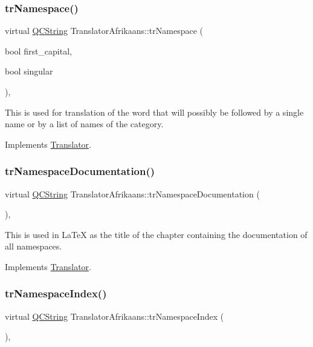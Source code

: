\subsubsection{\texorpdfstring{trNamespace()}{trNamespace()}}
{\footnotesize\ttfamily virtual \mbox{\hyperlink{class_q_c_string}{Q\+C\+String}} Translator\+Afrikaans\+::tr\+Namespace (\begin{DoxyParamCaption}\item[{bool}]{first\+\_\+capital,  }\item[{bool}]{singular }\end{DoxyParamCaption})\hspace{0.3cm}{\ttfamily [inline]}, {\ttfamily [virtual]}}

This is used for translation of the word that will possibly be followed by a single name or by a list of names of the category. 

Implements \mbox{\hyperlink{class_translator}{Translator}}.

\mbox{\label{class_translator_afrikaans_ad58b0c654b54e2bc80096f02e1426465}} 
\subsubsection{\texorpdfstring{trNamespaceDocumentation()}{trNamespaceDocumentation()}}
{\footnotesize\ttfamily virtual \mbox{\hyperlink{class_q_c_string}{Q\+C\+String}} Translator\+Afrikaans\+::tr\+Namespace\+Documentation (\begin{DoxyParamCaption}{ }\end{DoxyParamCaption})\hspace{0.3cm}{\ttfamily [inline]}, {\ttfamily [virtual]}}

This is used in La\+TeX as the title of the chapter containing the documentation of all namespaces. 

Implements \mbox{\hyperlink{class_translator}{Translator}}.

\mbox{\label{class_translator_afrikaans_afa672cfbcc119ff79a249f0010fb899b}} 
\subsubsection{\texorpdfstring{trNamespaceIndex()}{trNamespaceIndex()}}
{\footnotesize\ttfamily virtual \mbox{\hyperlink{class_q_c_string}{Q\+C\+String}} Translator\+Afrikaans\+::tr\+Namespace\+Index (\begin{DoxyParamCaption}{ }\end{DoxyParamCaption})\hspace{0.3cm}{\ttfamily [inline]}, {\ttfamily [virtual]}}

